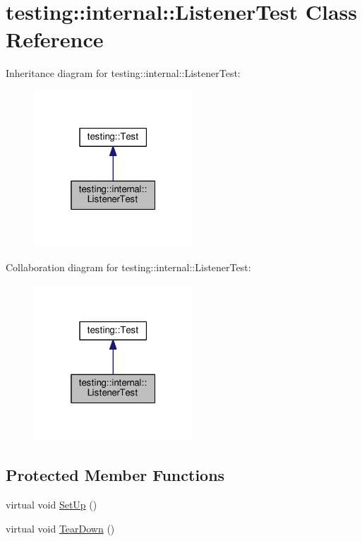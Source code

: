 \hypertarget{classtesting_1_1internal_1_1ListenerTest}{}\section{testing\+:\+:internal\+:\+:Listener\+Test Class Reference}
\label{classtesting_1_1internal_1_1ListenerTest}


Inheritance diagram for testing\+:\+:internal\+:\+:Listener\+Test\+:
\nopagebreak
\begin{figure}[H]
\begin{center}
\leavevmode
\includegraphics[width=169pt]{classtesting_1_1internal_1_1ListenerTest__inherit__graph}
\end{center}
\end{figure}


Collaboration diagram for testing\+:\+:internal\+:\+:Listener\+Test\+:
\nopagebreak
\begin{figure}[H]
\begin{center}
\leavevmode
\includegraphics[width=169pt]{classtesting_1_1internal_1_1ListenerTest__coll__graph}
\end{center}
\end{figure}
\subsection*{Protected Member Functions}
\begin{DoxyCompactItemize}
\item 
virtual void \hyperlink{classtesting_1_1internal_1_1ListenerTest_ace3dbe36b705ddf320518e6cdd919bc8}{Set\+Up} ()
\item 
virtual void \hyperlink{classtesting_1_1internal_1_1ListenerTest_ad112535025d668e3ea14e71d8741c810}{Tear\+Down} ()
\end{DoxyCompactItemize}
